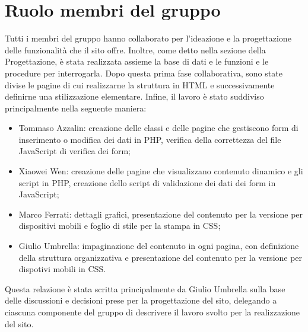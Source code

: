 \documentclass[1_relazione.tex]{subfiles}
\begin{document}
\section{Ruolo membri del gruppo}
Tutti i membri del gruppo hanno collaborato per l'ideazione e la progettazione delle funzionalità che il sito offre.
Inoltre, come detto nella sezione della Progettazione, è stata realizzata assieme la base di dati e le funzioni e le procedure per interrogarla.
Dopo questa prima fase collaborativa, sono state divise le pagine di cui realizzarne la struttura in HTML e successivamente definirne una stilizzazione elementare.
Infine, il lavoro è stato suddiviso principalmente nella seguente maniera:
\begin{itemize}
    \item Tommaso Azzalin: creazione delle classi e delle pagine che gestiscono form di inserimento o modifica dei dati in PHP, verifica della correttezza del file JavaScript di verifica dei form;
    \item Xiaowei Wen: creazione delle pagine che visualizzano contenuto dinamico e gli script in PHP, creazione dello script di validazione dei dati dei form in JavaScript;
    \item Marco Ferrati: dettagli grafici, presentazione del contenuto per la versione per dispositivi mobili e foglio di stile per la stampa in CSS;
    \item Giulio Umbrella: impaginazione del contenuto in ogni pagina, con definizione della struttura organizzativa e presentazione del contenuto per la versione per dispotivi mobili in CSS.
\end{itemize}
Questa relazione è stata scritta principalmente da Giulio Umbrella sulla base delle discussioni e decisioni prese per la progettazione del sito, delegando a ciascuna componente del gruppo di descrivere il lavoro svolto per la realizzazione del sito.
\end{document}
